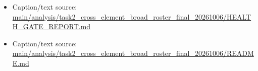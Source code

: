 \begin{itemize}[leftmargin=1.4em,noitemsep]
\item Caption/text source: \begingroup\scriptsize\url{main/analysis/task2_cross_element_broad_roster_final_20261006/HEALTH_GATE_REPORT.md}\endgroup
\item Caption/text source: \begingroup\scriptsize\url{main/analysis/task2_cross_element_broad_roster_final_20261006/README.md}\endgroup
\end{itemize}
